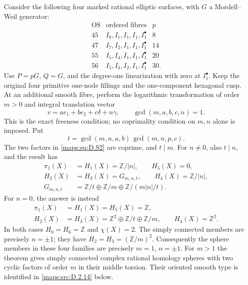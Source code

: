 \begin{theorem}
Consider the following four marked rational elliptic surfaces,
with $G$ a Mordell--Weil generator:
\[
\begin{array}{c|l|r}
\mathrm{OS}&\text{ordered fibres}&p\\\hline
45&I_8,I_1,I_1,I_1,I_1^\bullet&8\\
47&I_7,I_2,I_1,I_1,I_1^\bullet&14\\
55&I_5,I_4,I_1,I_1,I_1^\bullet&20\\
56&I_5,I_3,I_2,I_1,I_1^\bullet&30.
\end{array}
\]
Use $P=pG$, $Q=G$, and the degree-one linearization with zero
at $I_1^\bullet$. Keep the original four primitive one-node
fillings and the one-component hexagonal cusp. At an additional
smooth fibre, perform the logarithmic transformation of order
$m>0$ and integral translation vector
\[
 v=a e_1+b e_2+c\delta+n\gamma,\qquad
 \gcd(m,a,b,c,n)=1.
 \tag{D.S1}\label{maps:eq:D.S1}
\]
This is the exact freeness condition; no coprimality condition
on $m,n$ alone is imposed. Put
\[
 t=\gcd(m,n,a,b)\,\gcd(m,n,p,c).
 \tag{D.S2}\label{maps:eq:D.S2}
\]
The two factors in \eqref{maps:eq:D.S2} are coprime, and $t\mid m$.
For $n\ne0$, also $t\mid n$, and the result has
\[
\begin{aligned}
 \pi_1(X)&=H_1(X)=\mathbb Z/|n|,\qquad H_5(X)=0,\\
 H_2(X)&=H_3(X)=G_{m,n,t},\qquad H_4(X)=\mathbb Z/|n|,\\
 G_{m,n,t}&=\mathbb Z/t\oplus\mathbb Z/m
               \oplus\mathbb Z/(m|n|/t).
\end{aligned}
\tag{D.S3}\label{maps:eq:D.S3}
\]
For $n=0$, the answer is instead
\[
\begin{aligned}
 \pi_1(X)&=H_1(X)=H_5(X)=\mathbb Z,\\
 H_2(X)&=H_3(X)=\mathbb Z^2\oplus\mathbb Z/t\oplus\mathbb Z/m,
 \qquad H_4(X)=\mathbb Z^2.
\end{aligned}
\tag{D.S4}\label{maps:eq:D.S4}
\]
In both cases $H_0=H_6=\mathbb Z$ and $\chi(X)=2$.
The simply connected members are precisely $n=\pm1$; they
have $H_2=H_3=(\mathbb Z/m)^2$. Consequently the sphere
members in these four families are precisely $m=1$, $n=\pm1$.
For $m>1$ the theorem gives simply connected complex rational
homology spheres with two cyclic factors of order $m$ in their
middle torsion. Their oriented smooth type is identified in
\ref{maps:src:D.2.14} below.
\end{theorem}


